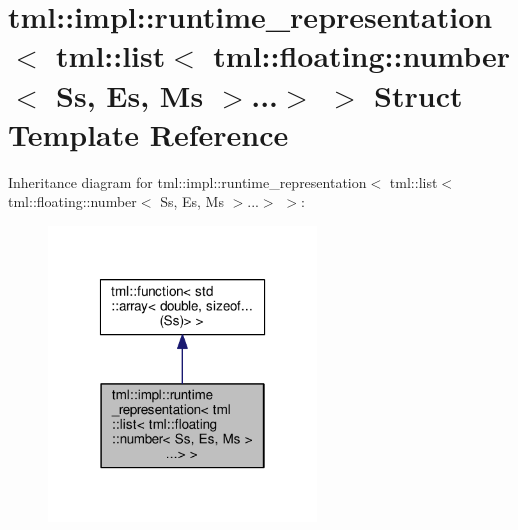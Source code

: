 \hypertarget{structtml_1_1impl_1_1runtime__representation_3_01tml_1_1list_3_01tml_1_1floating_1_1number_3_01_a41219e9cf2d8732b6c2c7d1768a8017}{\section{tml\+:\+:impl\+:\+:runtime\+\_\+representation$<$ tml\+:\+:list$<$ tml\+:\+:floating\+:\+:number$<$ Ss, Es, Ms $>$...$>$ $>$ Struct Template Reference}
\label{structtml_1_1impl_1_1runtime__representation_3_01tml_1_1list_3_01tml_1_1floating_1_1number_3_01_a41219e9cf2d8732b6c2c7d1768a8017}
}


Inheritance diagram for tml\+:\+:impl\+:\+:runtime\+\_\+representation$<$ tml\+:\+:list$<$ tml\+:\+:floating\+:\+:number$<$ Ss, Es, Ms $>$...$>$ $>$\+:
\nopagebreak
\begin{figure}[H]
\begin{center}
\leavevmode
\includegraphics[width=202pt]{structtml_1_1impl_1_1runtime__representation_3_01tml_1_1list_3_01tml_1_1floating_1_1number_3_01_603a4ba04d203d96e694eceb0b3c7ee5}
\end{center}
\end{figure}


